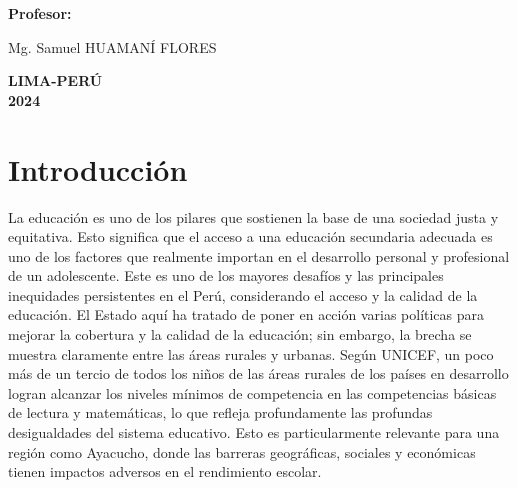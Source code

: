 \documentclass[
]{article}
\begin{document}
\begin{titlepage}
\begin{center}
\begin{large}
\begin{center}
\end{center}

\end{large}

\vspace*{0.2in}
\begin{large}
\textbf{Profesor:} \\
\end{large}
\vspace*{0.01in}

\begin{large}
Mg. Samuel HUAMANÍ  FLORES\\ [0.4cm]
\end{large}


\vspace*{0.3in}
\begin{large}
\textbf{LIMA-PERÚ }\\ [0.5cm]
\textbf{2024}
\end{large}
\end{center}
\end{titlepage}

\newpage

\renewcommand{\contentsname}{Indice de Contenido}

\tableofcontents

\newpage

\section*{Introducción}\label{introducciuxf3n}

La educación es uno de los pilares que sostienen la base de una sociedad
justa y equitativa. Esto significa que el acceso a una educación
secundaria adecuada es uno de los factores que realmente importan en el
desarrollo personal y profesional de un adolescente. Este es uno de los
mayores desafíos y las principales inequidades persistentes en el Perú,
considerando el acceso y la calidad de la educación. El Estado aquí ha
tratado de poner en acción varias políticas para mejorar la cobertura y
la calidad de la educación; sin embargo, la brecha se muestra claramente
entre las áreas rurales y urbanas. Según UNICEF, un poco más de un
tercio de todos los niños de las áreas rurales de los países en
desarrollo logran alcanzar los niveles mínimos de competencia en las
competencias básicas de lectura y matemáticas, lo que refleja
profundamente las profundas desigualdades del sistema educativo. Esto es
particularmente relevante para una región como Ayacucho, donde las
barreras geográficas, sociales y económicas tienen impactos adversos en
el rendimiento escolar.
\end{document}
